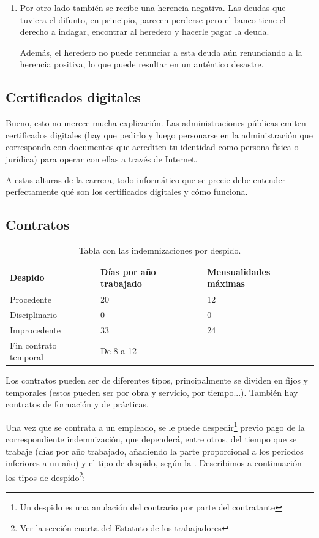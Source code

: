 \documentclass[nochap,palatino,shortheader]{apuntes}
\newcommand{\study}[1]{#1} \newcommand{\substudy}[1]{#1}
\begin{document}
\begin{enumerate}
\item Por otro lado también se recibe una herencia negativa. Las deudas que tuviera el difunto, en principio, parecen perderse pero el banco tiene el derecho a indagar, encontrar al heredero y hacerle pagar la deuda.

Además, el heredero no puede renunciar a esta deuda aún renunciando a la herencia positiva, lo que puede resultar en un auténtico desastre.
\end{enumerate}


\subsection{Certificados digitales}

Bueno, esto no merece mucha explicación. Las administraciones públicas emiten certificados digitales (hay que pedirlo y luego personarse en la administración que corresponda con documentos que acrediten tu identidad como persona física o jurídica) para operar con ellas a través de Internet.

A estas alturas de la carrera, todo informático que se precie debe entender perfectamente qué son los certificados digitales y cómo funciona.

\subsection{Contratos}

\begin{table}[hbtp]
\centering
\begin{tabular}{l|l|l}
\textbf{Despido} & \textbf{Días por año trabajado} & \textbf{Mensualidades máximas} \\ \toprule
Procedente & 20 & 12 \\
Disciplinario & 0 & 0 \\
Improcedente & 33 & 24 \\
Fin contrato temporal & De 8 a 12 & - \\
\end{tabular}
\caption{Tabla con las indemnizaciones por despido.}
\label{tab:Despido}
\end{table}

Los contratos pueden ser de diferentes tipos, principalmente se dividen en fijos y temporales (estos pueden ser por obra y servicio, por tiempo...). También hay contratos de formación y de prácticas.

Una vez que se contrata a un empleado, se le puede despedir\footnote{Un despido es una anulación del contrario por parte del contratante} previo pago de la correspondiente indemnización, que dependerá, entre otros, del tiempo que se trabaje (días por año trabajado, añadiendo la parte proporcional a los períodos inferiores a un año) y el tipo de despido, según la .
Describimos a continuación los \study{tipos de despido}\footnote{Ver la sección cuarta del \href{https://www.boe.es/buscar/act.php?id=BOE-A-1995-7730&tn=1&p=20151024}{Estatuto de los trabajadores}}:
\end{document}
